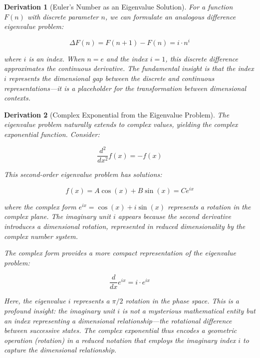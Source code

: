 \documentclass{article}
\newtheorem{derivation}{Derivation}
\begin{document}
\begin{derivation}[Euler's Number as an Eigenvalue Solution]
For a function $F(n)$ with discrete parameter $n$, we can formulate an analogous difference eigenvalue problem:

\begin{equation}
\Delta F(n) = F(n+1) - F(n) = i \cdot n^i
\end{equation}

where $i$ is an index. When $n = e$ and the index $i = 1$, this discrete difference approximates the continuous derivative. The fundamental insight is that the index $i$ represents the dimensional gap between the discrete and continuous representations—it is a placeholder for the transformation between dimensional contexts.
\end{derivation}

\begin{derivation}[Complex Exponential from the Eigenvalue Problem]
The eigenvalue problem naturally extends to complex values, yielding the complex exponential function. Consider:

\begin{equation}
\frac{d^2}{dx^2}f(x) = -f(x)
\end{equation}

This second-order eigenvalue problem has solutions:

\begin{equation}
f(x) = A\cos(x) + B\sin(x) = Ce^{ix}
\end{equation}

where the complex form $e^{ix} = \cos(x) + i\sin(x)$ represents a rotation in the complex plane. The imaginary unit $i$ appears because the second derivative introduces a dimensional rotation, represented in reduced dimensionality by the complex number system.

The complex form provides a more compact representation of the eigenvalue problem:

\begin{equation}
\frac{d}{dx}e^{ix} = i \cdot e^{ix}
\end{equation}

Here, the eigenvalue $i$ represents a $\pi/2$ rotation in the phase space. This is a profound insight: the imaginary unit $i$ is not a mysterious mathematical entity but an index representing a dimensional relationship—the rotational difference between successive states. The complex exponential thus encodes a geometric operation (rotation) in a reduced notation that employs the imaginary index $i$ to capture the dimensional relationship.
\end{derivation}
\end{document}
